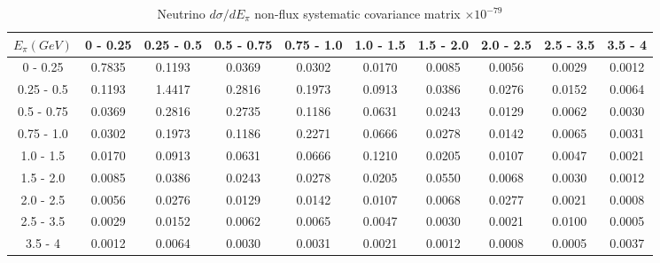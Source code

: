 \documentclass[aps,prl,twocolumn,showpacs,superscriptaddress,nofootinbib]{revtex4}
\begin{document}
\begingroup
\squeezetable
\begin{table}[h]
\tabcolsep=0.11cm
\begin{tabular}{c|ccccccccc}
$E_{\pi}(GeV)$ & 0 - 0.25 & 0.25 - 0.5 & 0.5 - 0.75 & 0.75 - 1.0 & 1.0 - 1.5 & 1.5 - 2.0 & 2.0 - 2.5 & 2.5 - 3.5 & 3.5 - 4 \\
\hline
0 - 0.25 &0.7835&	0.1193&	0.0369&	0.0302&	0.0170&	0.0085&	0.0056&	0.0029&	0.0012	\\
0.25 - 0.5& 0.1193&	1.4417&	0.2816&	0.1973&	0.0913&	0.0386&	0.0276&	0.0152&	0.0064	\\
0.5 - 0.75& 0.0369&	0.2816&	0.2735&	0.1186&	0.0631&	0.0243&	0.0129&	0.0062&	0.0030	\\
0.75 - 1.0 &0.0302&	0.1973&	0.1186&	0.2271&	0.0666&	0.0278&	0.0142&	0.0065&	0.0031	\\
1.0 - 1.5 &0.0170&	0.0913&	0.0631&	0.0666&	0.1210&	0.0205&	0.0107&	0.0047&	0.0021	\\
1.5 - 2.0 &0.0085&	0.0386&	0.0243&	0.0278&	0.0205&	0.0550&	0.0068&	0.0030&	0.0012	\\
2.0 - 2.5 &0.0056&	0.0276&	0.0129&	0.0142&	0.0107&	0.0068&	0.0277&	0.0021&	0.0008	\\
2.5 - 3.5 &0.0029&	0.0152&	0.0062&	0.0065&	0.0047&	0.0030&	0.0021&	0.0100&	0.0005\\	
3.5 - 4 &0.0012	&0.0064&	0.0030&	0.0031&	0.0021&	0.0012&	0.0008&	0.0005&	0.0037	\\
 
\end{tabular}
\caption{Neutrino $d\sigma/dE_\pi$ non-flux systematic covariance matrix  $\times 10^{-79}$ }
\label{tab:epi-nonflux}
\end{table}
\endgroup
\end{document}
